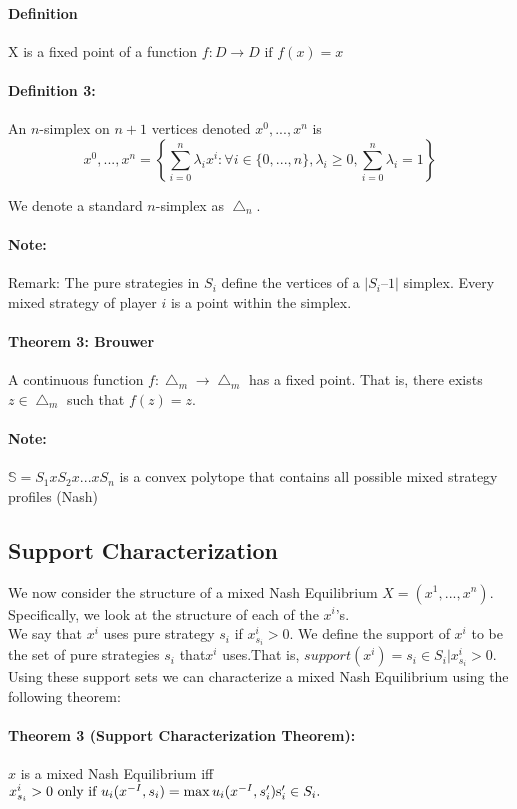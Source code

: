 \documentclass[12pt]{article}
\newcommand{\Note}{\paragraph{Note:}}
\newcommand{\Definition}{\paragraph{Definition}}
\begin{document}
\Definition X is a fixed point of a function $f: D \rightarrow D \text{ if } f(x) = x$

\paragraph{Definition 3:} An $n$-simplex on $n+1$ vertices denoted $x^0,...,x^n$ is 
\begin{equation*}
x^0,...,x^n = \left \{ \sum\limits_{i=0}^n \lambda_i x^i : \forall i \in \{0,...,n\}, \lambda_i \geq 0, \sum\limits_{i = 0}^n \lambda_i = 1 \right \}
\end{equation*}

We denote a standard $n$-simplex as $\bigtriangleup_n$.

\Note Remark: The pure strategies in $S_i$ define the vertices of a $|S_i – 1|$ simplex. Every mixed strategy of player $i$ is a point within the simplex. 

\paragraph{Theorem 3: Brouwer} A continuous function $f: \bigtriangleup_m \rightarrow \bigtriangleup_m$ has a fixed point. That is, there exists $z \in \bigtriangleup_m$ such that $f(z) = z$.

\Note $\mathbb{S} = S_1 x S_2 x ... x S_n$ is a convex polytope that contains all possible mixed strategy profiles (Nash)

\subsection{Support Characterization}

We now consider the structure of a mixed Nash Equilibrium $X = (x^1,..., x^n)$. Specifically, we look at the structure of each of the $x^i$’s.\\

We say that $x^i$ uses pure strategy $s_i$ if $x^i_{s_i} > 0$. We define the support of $x^i$ to be the set of pure strategies $s_i$ that$x^i$ uses.That is, $support(x^i) = {s_i \in S_i | x^i_{s_i} > 0}$. 
Using these support sets we can characterize a mixed Nash Equilibrium using the following theorem:

\paragraph{Theorem 3 (Support Characterization Theorem):}$x$ is a mixed Nash Equilibrium iff $x^i_{s_i} > 0 \text{ only if } u_i(x^{-I}, s_i) = \max u_i(x^{-I}, s_i') \text s_i' \in S_i.$
\end{document}
